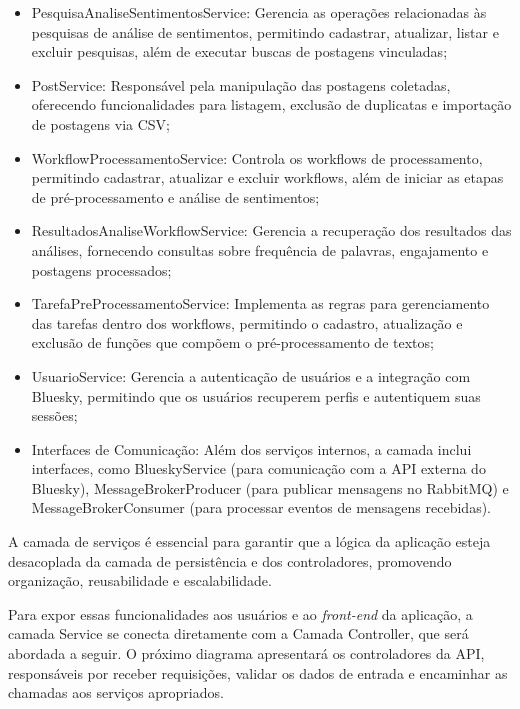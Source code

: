 \documentclass[
	12pt,				%
	oneside,			%
	a4paper,			%
	english,			%
	french,				%
	spanish,			%
	brazil				%
	]{abntex2}
\begin{document}
\begin{itemize}
\tightlist
\item
  PesquisaAnaliseSentimentosService: Gerencia as operações relacionadas
  às pesquisas de análise de sentimentos, permitindo cadastrar,
  atualizar, listar e excluir pesquisas, além de executar buscas de
  postagens vinculadas;
\item
  PostService: Responsável pela manipulação das postagens coletadas,
  oferecendo funcionalidades para listagem, exclusão de duplicatas e
  importação de postagens via CSV;
\item
  WorkflowProcessamentoService: Controla os workflows de processamento,
  permitindo cadastrar, atualizar e excluir workflows, além de iniciar
  as etapas de pré-processamento e análise de sentimentos;
\item
  ResultadosAnaliseWorkflowService: Gerencia a recuperação dos
  resultados das análises, fornecendo consultas sobre frequência de
  palavras, engajamento e postagens processados;
\item
  TarefaPreProcessamentoService: Implementa as regras para gerenciamento
  das tarefas dentro dos workflows, permitindo o cadastro, atualização e
  exclusão de funções que compõem o pré-processamento de textos;
\item
  UsuarioService: Gerencia a autenticação de usuários e a integração com
  Bluesky, permitindo que os usuários recuperem perfis e autentiquem
  suas sessões;
\item
  Interfaces de Comunicação: Além dos serviços internos, a camada inclui
  interfaces, como BlueskyService (para comunicação com a API externa do
  Bluesky), MessageBrokerProducer (para publicar mensagens no RabbitMQ)
  e MessageBrokerConsumer (para processar eventos de mensagens
  recebidas).
\end{itemize}

A camada de serviços é essencial para garantir que a lógica da aplicação
esteja desacoplada da camada de persistência e dos controladores,
promovendo organização, reusabilidade e escalabilidade.

Para expor essas funcionalidades aos usuários e ao \emph{front-end} da
aplicação, a camada Service se conecta diretamente com a Camada
Controller, que será abordada a seguir. O próximo diagrama apresentará
os controladores da API, responsáveis por receber requisições, validar
os dados de entrada e encaminhar as chamadas aos serviços apropriados.
\end{document}
